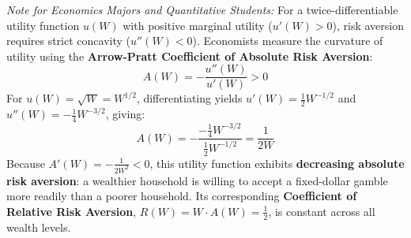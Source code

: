 \documentclass[11pt,letterpaper]{article}
\begin{document}
\begin{tcolorbox}[colback=blue!5!white,colframe=blue!75!black,title=\textbf{Optional Advanced Section: Arrow-Pratt Measure of Risk Aversion}]
\small
\emph{Note for Economics Majors and Quantitative Students:}
For a twice-differentiable utility function $u(W)$ with positive marginal utility ($u'(W) > 0$), risk aversion requires strict concavity ($u''(W) < 0$). Economists measure the curvature of utility using the \textbf{Arrow-Pratt Coefficient of Absolute Risk Aversion}:
\[
A(W) = -\frac{u''(W)}{u'(W)} > 0
\]
For $u(W) = \sqrt{W} = W^{1/2}$, differentiating yields $u'(W) = \frac{1}{2}W^{-1/2}$ and $u''(W) = -\frac{1}{4}W^{-3/2}$, giving:
\[
A(W) = -\frac{-\frac{1}{4}W^{-3/2}}{\frac{1}{2}W^{-1/2}} = \frac{1}{2W}
\]
Because $A'(W) = -\frac{1}{2W^2} < 0$, this utility function exhibits \textbf{decreasing absolute risk aversion}: a wealthier household is willing to accept a fixed-dollar gamble more readily than a poorer household. Its corresponding \textbf{Coefficient of Relative Risk Aversion}, $R(W) = W \cdot A(W) = \frac{1}{2}$, is constant across all wealth levels.
\end{tcolorbox}
\end{document}

